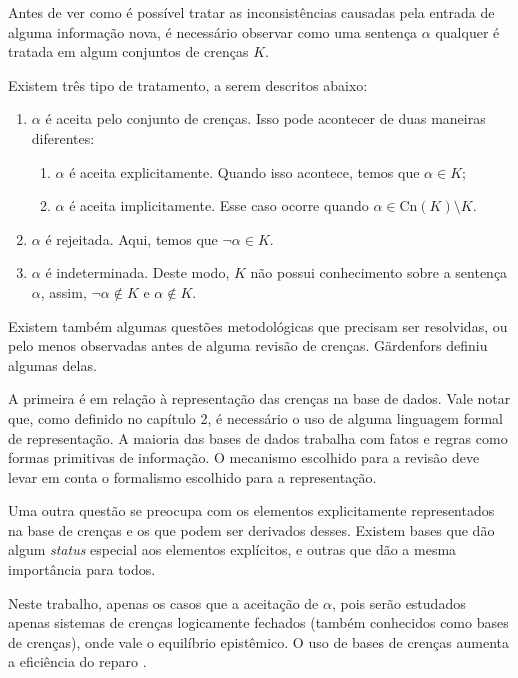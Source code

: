 Antes de ver como é possível tratar as inconsistências causadas pela entrada de alguma informação nova, é necessário observar como uma sentença $ \alpha $ qualquer é tratada em algum conjuntos de crenças $ K $.

Existem três tipo de tratamento, a serem descritos abaixo:

\begin{enumerate}
	\item $ \alpha $ é aceita pelo conjunto de crenças. Isso pode acontecer de duas maneiras diferentes:
	\begin{enumerate}
		\item $ \alpha $ é aceita explicitamente. Quando isso acontece, temos que $ \alpha \in K $;
		\item $ \alpha $ é aceita implicitamente. Esse caso ocorre quando $ \alpha \in \text{Cn}(K) \setminus K $.
	\end{enumerate}
	\item $ \alpha $ é rejeitada. Aqui, temos que $ \lnot \alpha \in K $. 
	\item $ \alpha $ é indeterminada. Deste modo, $ K $ não possui conhecimento sobre a sentença $ \alpha $, assim, $ \lnot \alpha \notin K $ e $ \alpha \notin K $.
\end{enumerate}

Existem também algumas questões metodológicas que precisam ser resolvidas, ou pelo menos observadas antes de alguma revisão de crenças. Gärdenfors \cite{revisaoGardenfors2} definiu algumas delas.

A primeira é em relação à representação das crenças na base de dados. Vale notar que, como definido no capítulo 2, é necessário o uso de alguma linguagem formal de representação. A maioria das bases de dados trabalha com fatos e regras como formas primitivas de informação. O mecanismo escolhido para a revisão deve levar em conta o formalismo escolhido para a representação.

Uma outra questão se preocupa com os elementos explicitamente representados na base de crenças e os que podem ser derivados desses. Existem bases que dão algum \textit{status} especial aos elementos explícitos, e outras que dão a mesma importância para todos. 

Neste trabalho, apenas os casos que a aceitação de $ \alpha $, pois serão estudados apenas sistemas de crenças logicamente fechados (também conhecidos como bases de crenças), onde vale o equilíbrio epistêmico. O uso de bases de crenças aumenta a eficiência do reparo \cite{revisaoHansson}.  

